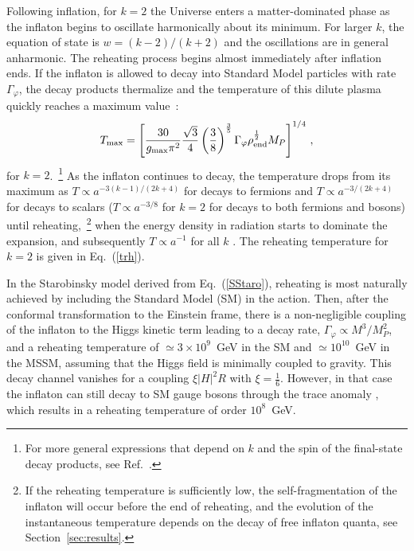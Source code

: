 \documentclass[aps,prev,twocolumn,preprintnumbers,floatfix,nofootinbib]{revtex4-1}
\begin{document}
Following inflation, for $k=2$ the Universe enters a matter-dominated phase as the inflaton begins to oscillate harmonically about its minimum. For larger $k$, the equation of state is $w = (k-2)/(k+2)$ and the oscillations are in general anharmonic.  The reheating process begins almost immediately after inflation ends. If the inflaton is allowed to decay into Standard Model particles with rate $\Gamma_\varphi$, the decay products thermalize \cite{Davidson:2000er,Harigaya:2013vwa,Mukaida:2015ria,GA,Passaglia:2021upk,Drees:2021lbm,Drees:2022vvn,Mukaida:2022bbo} and the temperature of this dilute plasma quickly reaches a maximum value~\cite{Giudice:2000ex, Ellis:2015jpg}:
\begin{equation}
T_{\max} =  \left[ \frac{30}{g_{\rm max} \pi^2} \frac{\sqrt{3}}{4} \left(\frac38 \right)^\frac35 \Gamma_{\varphi} \rho_{\rm end}^\frac12 M_P \right]^{1/4} \, ,
\end{equation}
for $k=2$.~\footnote{For more general expressions that
depend on $k$ and the spin of the final-state decay products, see Ref.~\cite{gkmo2}.} As the inflaton continues to decay, the temperature drops from its maximum as $T \propto a^{-3(k-1)/(2k+4)}$ for decays to fermions and $T \propto a^{-3/(2k+4)}$ for decays to scalars ($T \propto a^{-3/8}$ for $k=2$ for decays to both fermions and bosons) until reheating,~\footnote{If the reheating temperature is sufficiently low, the self-fragmentation of the inflaton will occur before the end of reheating, and the evolution of the instantaneous temperature depends on the decay of free inflaton quanta, see Section~\ref{sec:results}.} when the energy density in radiation starts to dominate the expansion, and subsequently $T \propto a^{-1}$ for all $k$ \cite{GKMO,gkmo2}. 
The reheating temperature for $k=2$ is given in Eq.~(\ref{trh}).

In the Starobinsky model derived from Eq.~(\ref{SStaro}), reheating is most naturally achieved by including the Standard Model (SM) in the action. Then, after the conformal transformation to the Einstein frame, there is a 
non-negligible coupling of the inflaton to the Higgs kinetic term leading to a decay rate,
$\Gamma_\varphi \propto M^3/M_P^2$, and a reheating temperature of $\simeq 3 \times 10^9$~GeV in the SM and $\simeq 10^{10}$~GeV in the MSSM, assuming that the Higgs field is minimally coupled to gravity. This decay channel vanishes for a coupling $\xi |H|^2 R$ with $\xi = \frac16$. However, in that case the inflaton can still decay to SM gauge bosons through the trace anomaly \cite{Gorbunov:2012ns}, which results in a reheating temperature of order $10^8$~GeV. 
\end{document}
